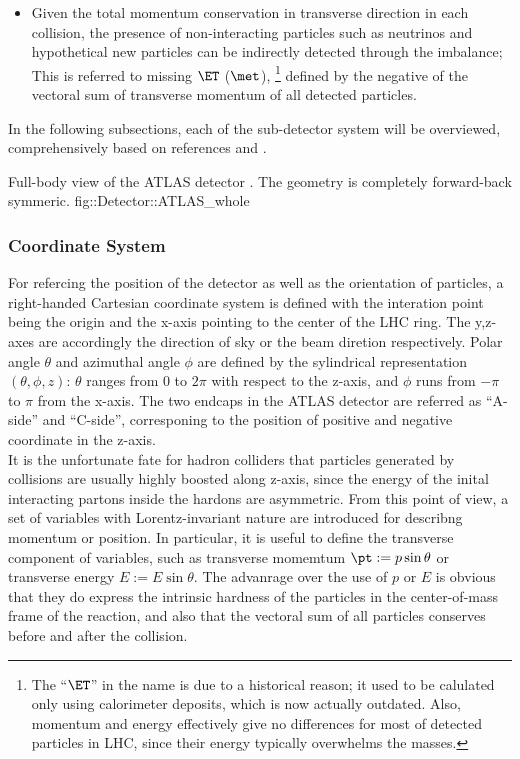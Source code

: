 \begin{itemize}
\item Given the total momentum conservation in transverse direction in each collision, 
the presence of non-interacting particles such as neutrinos and hypothetical new particles can be indirectly detected through the imbalance; 
This is referred to missing $\ET$ ($\met$), 
\footnote{The ``$\ET$'' in the name is due to a historical reason; it used to be calulated only using calorimeter deposits, which is now actually outdated. 
Also, momentum and energy effectively give no differences for most of detected particles in LHC, since their energy typically overwhelms the masses.}
defined by the negative of the vectoral sum of transverse momentum of all detected particles.
\end{itemize}


In the following subsections, each of the sub-detector system will be overviewed, comprehensively based on references \cite{ATLAS_exp} and \cite{ATLAS_TDR}.

{Full-body view of the ATLAS detector \cite{ATLAScosmicPerf}. The geometry is completely forward-back symmeric.}
{fig::Detector::ATLAS_whole}


\subsubsection{Coordinate System}
For refercing the position of the detector as well as the orientation of particles, a right-handed Cartesian coordinate system is defined with the interation point being the origin and the x-axis pointing to the center of the LHC ring. The y,z-axes are accordingly the direction of sky or the beam diretion respectively. Polar angle $\theta$ and azimuthal angle $\phi$ are defined by the sylindrical representation $(\theta,\phi,z)$: $\theta$ ranges from 0 to $2\pi$ with respect to the z-axis, and $\phi$ runs from $-\pi$ to $\pi$ from the x-axis. The two endcaps in the ATLAS detector are referred as ``A-side'' and ``C-side'', corresponing to the position of positive and negative coordinate in the z-axis. \\

It is the unfortunate fate for hadron colliders that particles generated by collisions are usually highly boosted along z-axis, since the energy of the inital interacting partons inside the hardons are asymmetric. From this point of view, a set of variables with Lorentz-invariant nature are introduced for describng momentum or position. In particular, it is useful to define the transverse component of variables, such as transverse momemtum $\pt := p\sin{\theta}$ or transverse energy $E := E\sin{\theta}$. The advanrage over the use of $p$ or $E$ is obvious that they do express the intrinsic hardness of the particles in the center-of-mass frame of the reaction, and also that the vectoral sum of all particles conserves before and after the collision. \\

